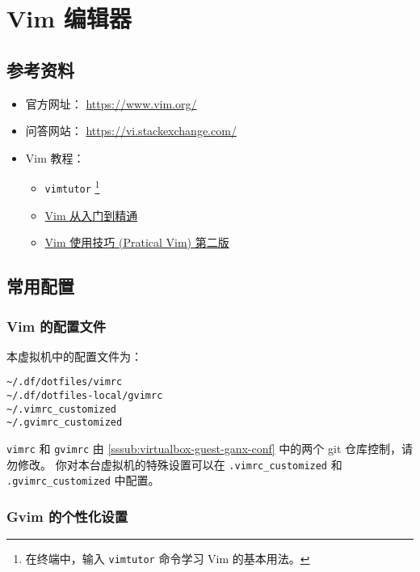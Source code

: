 \documentclass[cn,11pt, simple]{elegantbook}
\begin{document}
\section{Vim 编辑器}%
\label{sec:vim}

\subsection{参考资料}%
\label{sub:vim-refs}

\begin{itemize}
    \item 官方网址： \href{https://www.vim.org/}{https://www.vim.org/}
    \item 问答网站：
        \href{https://vi.stackexchange.com/}{https://vi.stackexchange.com/}
    \item Vim 教程：
        \begin{itemize}
            \item \lstinline{vimtutor}
                \footnote{在终端中，输入 \lstinline{vimtutor} 命令学习 Vim
                的基本用法。}
            \item \href{https://github.com/wsdjeg/vim-galore-zh_cn}
                {Vim 从入门到精通}
            \item \href{https://item.jd.com/12056490.html}
                {Vim 使用技巧 (Pratical Vim) 第二版}
        \end{itemize}
\end{itemize}

\subsection{常用配置}%
\label{sub:vim-intro}

\subsubsection{Vim 的配置文件}%
\label{ssub:vim-config}

本虚拟机中的配置文件为：
\begin{lstlisting}[escapeinside=``]
~/.df/dotfiles/vimrc
~/.df/dotfiles-local/gvimrc
~/.vimrc_customized
~/.gvimrc_customized
\end{lstlisting}
\lstinline{vimrc} 和 \lstinline{gvimrc} 由
\ref{sssub:virtualbox-guest-ganx-conf} 中的两个 git 仓库控制，请勿修改。
你对本台虚拟机的特殊设置可以在 \lstinline{.vimrc_customized} 和
\lstinline{.gvimrc_customized} 中配置。

\subsubsection{Gvim 的个性化设置}%
\label{ssub:vim-gui-config-customized}
\end{document}
